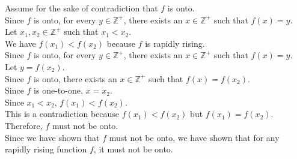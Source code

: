 \documentclass[12pt]{exam}
\begin{document}
\begin{solution}
  Assume for the sake of contradiction that $f$ is onto.\\
  Since $f$ is onto, for every $y\in\mathbb{Z}^+$, there exists an $x\in\mathbb{Z}^+$ such that $f(x) = y$.\\
  Let $x_1, x_2 \in \mathbb{Z}^+$ such that $x_1 < x_2$.\\
  We have $f(x_1) < f(x_2)$ because $f$ is rapidly rising.\\
  Since $f$ is onto, for every $y\in\mathbb{Z}^+$, there exists an $x\in\mathbb{Z}^+$ such that $f(x) = y$.\\
  Let $y = f(x_2)$.\\
  Since $f$ is onto, there exists an $x\in\mathbb{Z}^+$ such that $f(x) = f(x_2)$.\\
  Since $f$ is one-to-one, $x = x_2$.\\
  Since $x_1 < x_2$, $f(x_1) < f(x_2)$.\\
  This is a contradiction because $f(x_1) < f(x_2)$ but $f(x_1) = f(x_2)$.\\
  Therefore, $f$ must not be onto.\\
  Since we have shown that $f$ must not be onto, we have shown that for any rapidly rising function $f$, it must not be onto.
\end{solution}
\end{document}
